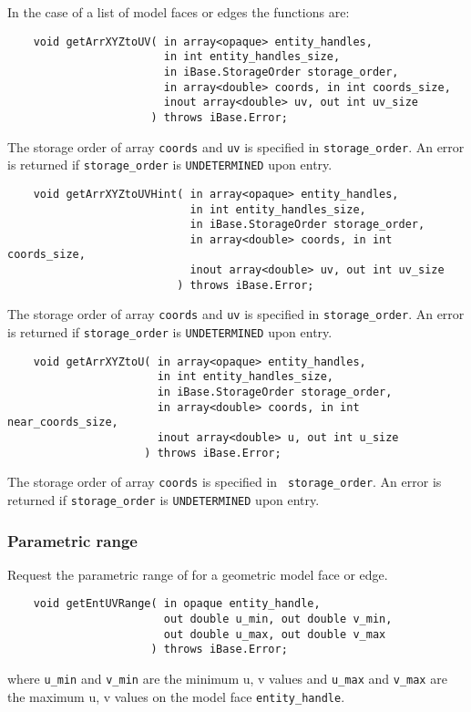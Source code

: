 \documentclass{article}
\begin{document}
\hspace{-16pt}In the case of a list of model faces or edges the functions 
are:

\begin{verbatim}
    void getArrXYZtoUV( in array<opaque> entity_handles, 
                        in int entity_handles_size,
                        in iBase.StorageOrder storage_order,
                        in array<double> coords, in int coords_size,
                        inout array<double> uv, out int uv_size
                      ) throws iBase.Error;
\end{verbatim}
The storage order of array {\tt coords} and {\tt uv} is specified in
 {\tt storage\_order}. An error is returned if {\tt storage\_order}
 is {\tt UNDETERMINED} upon entry.
 
 \begin{verbatim}
    void getArrXYZtoUVHint( in array<opaque> entity_handles, 
                            in int entity_handles_size,
                            in iBase.StorageOrder storage_order,
                            in array<double> coords, in int coords_size,
                            inout array<double> uv, out int uv_size
                          ) throws iBase.Error;
\end{verbatim}
The storage order of array {\tt coords} and {\tt uv} is specified in
 {\tt storage\_order}. An error is returned if {\tt storage\_order}
 is {\tt UNDETERMINED} upon entry.

\begin{verbatim}
    void getArrXYZtoU( in array<opaque> entity_handles, 
                       in int entity_handles_size,
                       in iBase.StorageOrder storage_order,
                       in array<double> coords, in int near_coords_size,
                       inout array<double> u, out int u_size
                     ) throws iBase.Error;
\end{verbatim}
The storage order of array {\tt coords} is specified in {\tt
 storage\_order}. An error is returned if {\tt storage\_order}
 is {\tt UNDETERMINED} upon entry.
\subsubsection{Parametric range}
Request the parametric range of for a geometric model face 
or edge.

\begin{verbatim}
    void getEntUVRange( in opaque entity_handle,
                        out double u_min, out double v_min,
                        out double u_max, out double v_max
                      ) throws iBase.Error;
\end{verbatim}
where {\tt u\_min} and {\tt v\_min} are the minimum u, v values 
and {\tt u\_max} and {\tt v\_max} are the maximum u, v values on the
model face {\tt entity\_handle}.
\end{document}
